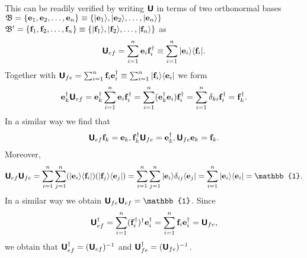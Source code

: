 This can be readily verified\cite{Schwinger.60} by writing $\textsf{\textbf{U}}$
in terms of two orthonormal bases
${\frak B}=\{{\bf e}_1,  {\bf e}_2, \ldots , {\bf e}_n\}\equiv \{\vert {\bf e}_1\rangle , \vert  {\bf e}_2\rangle , \ldots , \vert {\bf e}_n\rangle \}$
${\frak B}'=\{{\bf f}_1,  {\bf f}_2, \ldots , {\bf f}_n\}\equiv \{\vert {\bf f}_1\rangle , \vert  {\bf f}_2\rangle , \ldots , \vert {\bf f}_n\rangle \}$ as
\begin{equation}
\textsf{\textbf{U}}_{ef}= \sum_{i=1}^n  {\bf e}_i {\bf f}_i^\dagger
\equiv \sum_{i=1}^n  \vert {\bf e}_i\rangle \langle {\bf f}_i \vert
.
\label{2019-ch-fdvs-ditoonb}
\end{equation}
Together with $\textsf{\textbf{U}}_{fe}= \sum_{i=1}^n  {\bf f}_i {\bf e}_i^\dagger \equiv  \sum_{i=1}^n  \vert {\bf f}_i\rangle \langle {\bf e}_i \vert $
we form
\begin{equation}
\begin{split}
{\bf e}_k^\dagger \textsf{\textbf{U}}_{ef}  = {\bf e}_k^\dagger\sum_{i=1}^n  {\bf e}_i {\bf f}_i^\dagger
= \sum_{i=1}^n  ({\bf e}_k^\dagger {\bf e}_i) {\bf f}_i^\dagger
= \sum_{i=1}^n  \delta_{ki} {\bf f}_i^\dagger   = {\bf f}_k^\dagger
.
\end{split}
\end{equation}
In a similar way we find that
\begin{equation}
\begin{split}
\textsf{\textbf{U}}_{ef} {\bf f}_k = {\bf e}_k,
{\bf f}_k^\dagger \textsf{\textbf{U}}_{fe}   = {\bf e}_k^\dagger ,
\textsf{\textbf{U}}_{fe} {\bf e}_k  = {\bf f}_k .
\end{split}
\end{equation}
Moreover,
\begin{equation}
\begin{split}
\textsf{\textbf{U}}_{ef}\textsf{\textbf{U}}_{fe}
=
 \sum_{i=1}^n  \sum_{j=1}^n
(\vert {\bf e}_i\rangle \langle {\bf f}_i \vert )
(\vert {\bf f}_j\rangle \langle {\bf e}_j \vert )
=
 \sum_{i=1}^n  \sum_{j=1}^n
\vert {\bf e}_i\rangle \delta_{ij} \langle {\bf e}_j \vert
=
 \sum_{i=1}^n
\vert {\bf e}_i\rangle   \langle {\bf e}_i \vert
=
\mathbb{1}
.
\end{split}
\end{equation}
In a similar way we obtain
$\textsf{\textbf{U}}_{fe}\textsf{\textbf{U}}_{ef}=
\mathbb{1}$.
Since
\begin{equation}
\textsf{\textbf{U}}_{ef}^\dagger = \sum_{i=1}^n  ( {\bf f}_i^\dagger )^\dagger {\bf e}_i^\dagger
= \sum_{i=1}^n  {\bf f}_i {\bf e}_i^\dagger
= \textsf{\textbf{U}}_{fe},
\end{equation}
we obtain that $\textsf{\textbf{U}}_{ef}^\dagger = (\textsf{\textbf{U}}_{ef})^{-1}$
and $\textsf{\textbf{U}}_{fe}^\dagger = (\textsf{\textbf{U}}_{fe})^{-1}$.

